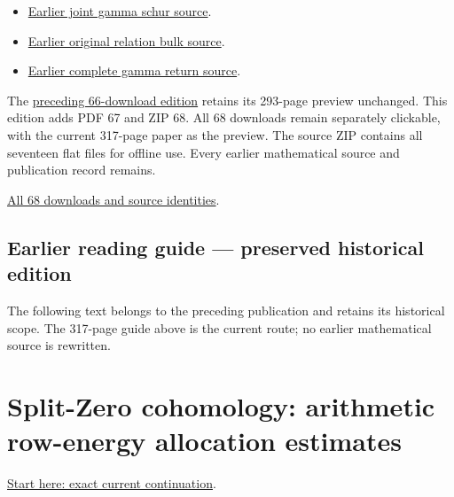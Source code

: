\documentclass[
]{article}
\begin{document}
\begin{itemize}
{  gamma growth source}.
\item
  \href{https://github.com/KokunoYumeto/zeta-function-research-reader/tree/2be3b23974bf040f4ea06240b8a4b85372f7c71d/workbenches/splitzero-tandem/continuations/20260914-joint-gamma-schur}{Earlier
  joint gamma schur source}.
\item
  \href{https://github.com/KokunoYumeto/zeta-function-research-reader/tree/01fc8820e3a3ea69afa22b8ab1b0b5ca61869456/workbenches/splitzero-tandem/continuations/20260914-original-relation-bulk}{Earlier
  original relation bulk source}.
\item
  \href{https://github.com/KokunoYumeto/zeta-function-research-reader/tree/01fc8820e3a3ea69afa22b8ab1b0b5ca61869456/workbenches/splitzero-tandem/continuations/20260914-complete-gamma-return}{Earlier
  complete gamma return source}.
\end{itemize}

The \href{https://doi.org/10.5281/zenodo.22760598}{preceding 66-download
edition} retains its 293-page preview unchanged. This edition adds PDF
67 and ZIP 68. All 68 downloads remain separately clickable, with the
current 317-page paper as the preview. The source ZIP contains all
seventeen flat files for offline use. Every earlier mathematical source
and publication record remains.

\href{calculation_edition_20260915_allocation/README.md}{All 68
downloads and source identities}.

\subsection{Earlier reading guide --- preserved historical
edition}\label{earlier-reading-guide-preserved-historical-edition-3}

The following text belongs to the preceding publication and retains its
historical scope. The 317-page guide above is the current route; no
earlier mathematical source is rewritten.

\section{Split-Zero cohomology: arithmetic row-energy allocation
estimates}\label{split-zero-cohomology-arithmetic-row-energy-allocation-estimates-1}

\href{https://github.com/KokunoYumeto/zeta-function-research-reader/blob/main/workbenches/splitzero-tandem/continuations/20260915-allocation-continuation/00_CONTINUE_HERE.md}{Start
here: exact current continuation}.
\end{document}
